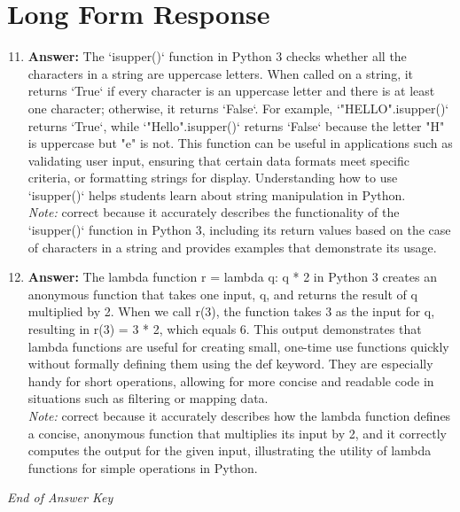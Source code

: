 \documentclass[12pt]{article}
\begin{document}
\section*{Long Form Response}
\begin{enumerate}[label=\arabic*.]
\setcounter{enumi}{10}
\item \textbf{Answer:} The `isupper()` function in Python 3 checks whether all the characters in a string are uppercase letters. When called on a string, it returns `True` if every character is an uppercase letter and there is at least one character; otherwise, it returns `False`. For example, `"HELLO".isupper()` returns `True`, while `"Hello".isupper()` returns `False` because the letter "H" is uppercase but "e" is not. This function can be useful in applications such as validating user input, ensuring that certain data formats meet specific criteria, or formatting strings for display. Understanding how to use `isupper()` helps students learn about string manipulation in Python.
\\ \textit{Note:} correct because it accurately describes the functionality of the `isupper()` function in Python 3, including its return values based on the case of characters in a string and provides examples that demonstrate its usage.
\item \textbf{Answer:} The lambda function r = lambda q: q * 2 in Python 3 creates an anonymous function that takes one input, q, and returns the result of q multiplied by 2. When we call r(3), the function takes 3 as the input for q, resulting in r(3) = 3 * 2, which equals 6. This output demonstrates that lambda functions are useful for creating small, one-time use functions quickly without formally defining them using the def keyword. They are especially handy for short operations, allowing for more concise and readable code in situations such as filtering or mapping data.
\\ \textit{Note:} correct because it accurately describes how the lambda function defines a concise, anonymous function that multiplies its input by 2, and it correctly computes the output for the given input, illustrating the utility of lambda functions for simple operations in Python.
\end{enumerate}

\vfill
\noindent\textit{End of Answer Key}
\end{document}
